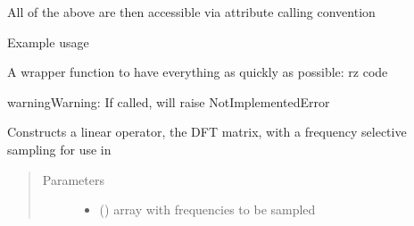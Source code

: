 \documentclass[letterpaper,10pt,english]{sphinxmanual}
\begin{document}
\begin{fulllineitems}
\begin{fulllineitems}
\begin{quote}
\begin{description}
\end{description}\end{quote}

All of the above are then accessible via attribute calling convention
\begin{description}
\item[{Example usage}] \leavevmode
{}%
\begin{sphinxVerbatim}[commandchars=\\\{\}]
\end{sphinxVerbatim}

\end{description}

\end{fulllineitems}


\begin{fulllineitems}
\label{\detokenize{FIT:FIT.FIT.defaultModelBOR}}
A wrapper function to have everything as quickly as possible: rz code

\begin{sphinxadmonition}{warning}{Warning:}
If called, will raise NotImplementedError
\end{sphinxadmonition}

\end{fulllineitems}


\begin{fulllineitems}
\label{\detokenize{FIT:FIT.FIT.dftMatrix}}
Constructs a linear operator, the DFT matrix, with a frequency selective sampling for use in 
\begin{quote}\begin{description}
\item[{Parameters}] \leavevmode\begin{itemize}
\item {} 
 () \textendash{} array with frequencies to be sampled


\end{itemize}
\end{description}
\end{quote}
\end{fulllineitems}
\end{fulllineitems}
\end{document}
